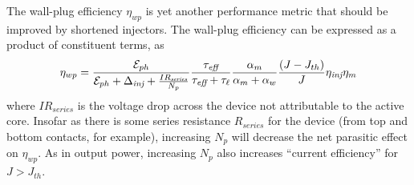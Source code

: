 The wall-plug efficiency $\eta_{wp}$ is yet another performance metric that should be improved by shortened injectors.  The wall-plug efficiency can be expressed as a product of constituent terms, as
\begin{equation}
\eta_{wp}= \frac{\EE_{ph}}{\EE_{ph}+\Delta_\textit{inj}+\frac{I R_\textit{series}}{N_p}} \frac{\tau_\textit{eff}}{\tau_\textit{eff}+\tau_\ell} \frac{\alpha_m}{\alpha_m + \alpha_w} \frac{(J-J_{th})}{J} \eta_\textit{inj} \eta_m
\end{equation}
where $I R_\textit{series}$ is the voltage drop across the device not attributable to the active core.  Insofar as there is some series resistance $R_\textit{series}$ for the device (from top and bottom contacts, for example), increasing $N_p$ will decrease the net parasitic effect on $\eta_{wp}$.  As in output power, increasing $N_p$ also increases ``current efficiency'' for $J>J_{th}$.  %

